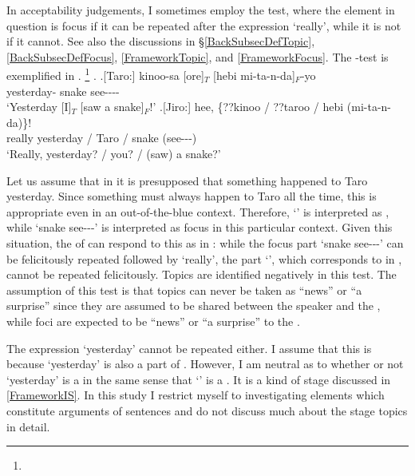 In acceptability judgements,
I sometimes employ the  test,
where the element in question is focus if it can be repeated after the expression  `really',
while it is not if it cannot.
See also the discussions in \S \ref{BackSubsecDefTopic}, \ref{BackSubsecDefFocus}, \ref{FrameworkTopic}, and \ref{FrameworkFocus}.
The -test is exemplified in \Next.%
 \footnote{
 }
\ex.\label{Fr:Method:Ex:Hebi} \ag.[Taro:] kinoo-sa [ore]$_{T}$ [hebi mi-ta-n-da]$_{F}$-yo \\
		yesterday-  snake see---- \\
	`Yesterday [I]$_{T}$ [saw a snake]$_{F}$!'
	\bg.[Jiro:] hee, \{??kinoo / ??taroo / hebi (mi-ta-n-da)\}! \\
			really yesterday / Taro / snake (see---) \\
			`Really, yesterday? / you? / (saw) a snake?'

Let us assume that in \Last[-Taro] it is presupposed that something happened to Taro yesterday.
Since something must always happen to Taro all the time,
this  is appropriate even in an out-of-the-blue context.
Therefore,
 `' is interpreted as ,
while  `snake see---' is interpreted as focus in this particular context.
Given this situation,
the  of \Last[-Taro] can respond to this  as in \Last[-Jiro]:
while the focus part  `snake see---' can be felicitously repeated followed by  `really',
the  part  `',
which corresponds to  in \Last[-Jiro], cannot be repeated felicitously.
Topics are identified negatively in this test.
The assumption of this  test is that
topics can never be taken as ``news'' or ``a surprise'' since they are assumed to be shared between the speaker and the ,
while foci are expected to be ``news'' or ``a surprise'' to the .

The expression  `yesterday' cannot be repeated either.
I assume that this is because  `yesterday' is also a part of .
However, I am neutral as to whether or not  `yesterday' is a 
in the same sense that  `' is a .
It is a kind of stage  discussed in \ref{FrameworkIS}.
In this study I restrict myself to investigating elements which constitute arguments of sentences
and do not discuss much about the stage topics in detail.

